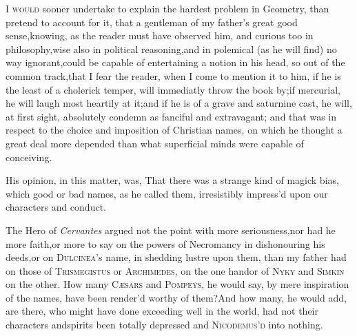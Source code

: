 \documentclass{article}
\begin{document}
\lettrine{I}{ would} sooner undertake to explain
the hardest problem in Geometry,\break
than pretend to account for it, that a\break
gentleman of my father’s great good\pb
sense,\tsh  knowing, as the reader must have observed him,
and curious too in philosophy,\tsk  wise also in political
reasoning,\tsk  and in polemical (as he will find) no way
ignorant,\tsk  could be capable of entertaining a notion in his
head, so out of the common track,\tsk  that I fear the reader,
when I come to mention it to him, if he is the least of a cholerick
temper, will immediatly throw the book by;\break if mercurial, he will
laugh most heartily at it;\tsk  and if he is of a grave and
saturnine cast, he will, at first sight, absolutely condemn as
fanciful and extravagant; and that was in respect to the choice and
imposition of Christian names, on which he thought a great deal
more depended than what superficial minds were capable of
conceiving.

\newpage
His opinion, in this matter, was, That there was a strange kind
of magick bias, which good or bad names, as he called them,
irresistibly impress’d upon our cha\-racters and conduct.

The Hero of \textit{Cervantes} argued not the point with more
seriousness,\tsh  nor had he more faith,\tsh  or
more to say on the powers of Necromancy in dishonouring his
deeds,\tsk  or on \textsc{Dulcinea}’s name, in
shedding lustre upon them, than my father had on those of
\textsc{Trismegistus} or \textsc{Archimedes}, on the
one hand\tsk  or of \textsc{Nyky} and \textsc{Simkin}
on the other. How many \textsc{Cæsars} and
\textsc{Pompeys}, he would say, by mere inspiration of the
names, have been render’d worthy of them?\break And how many, he would
add, are there, who might have done exceeding well in the world,
had not their characters and\pb spirits been totally depressed and
\textsc{Nico\-demus’d} into nothing.
\end{document}
